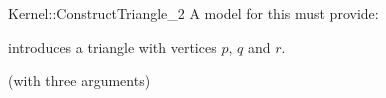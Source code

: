 \begin{ccRefFunctionObjectConcept}{Kernel::ConstructTriangle_2}
A model for this must provide:


            {introduces a triangle  with vertices $p$,  $q$ and $r$.}

\ccRefines
{} (with three arguments)

\ccSeeAlso
{}\\

\end{ccRefFunctionObjectConcept}
